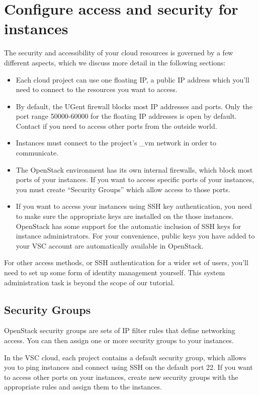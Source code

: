 \chapter{Configure access and security for instances}\label{cha:conf-access-secur}
The security and accessibility of your cloud resources is governed by
a few different aspects, which we discuss more detail in the following
sections:
\begin{itemize}
\item Each cloud project can use one floating IP, a public IP address
  which you'll need to connect to the resources you want to access.
\item By default, the UGent firewall blocks most IP addresses and
  ports.  Only the port range 50000-60000 for the floating IP
  addresses is open by default.  Contact \cloudinfo if you need to
  access other ports from the outside world.
\item Instances must connect to the project's \_vm network in order to
  communicate.
\item The OpenStack environment has its own internal firewalls, which
  block most ports of your instances.  If you want to access specific
  ports of your instances, you must create ``Security Groups'' which
  allow access to those ports.
\item If you want to access your instances using SSH key
  authentication, you need to make sure the appropriate keys are
  installed on the those instances.  OpenStack has some support for
  the automatic inclusion of SSH keys for instance administrators.
  For your convenience, public keys you have added to your VSC account
  are automatically available in OpenStack.
\end{itemize}
For other access methods, or SSH authentication for a wider set of
users, you'll need to set up some form of identity management
yourself.  This system administration task is beyond the scope of our
tutorial.

\section{Security Groups}\label{sec:security-groups}
OpenStack security groups are sets of IP filter rules that define
networking access.  You can then assign one or more security groups to
your instances.

In the VSC cloud, each project contains a default security group,
which allows you to ping instances and connect using SSH on the
default port 22.  If you want to access other ports on your instances,
create new security groups with the appropriate rules and assign them
to the instances.

